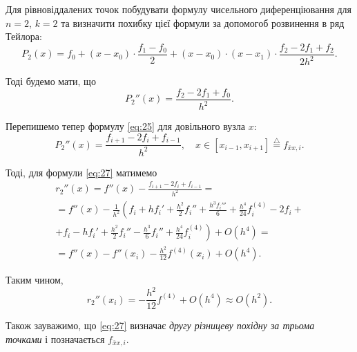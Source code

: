 \begin{example}
	Для рівновіддалених точок побудувати формулу чисельного диференціювання для $n = 2$, $k = 2$ та визначити похибку цієї формули за допомогоб розвинення в ряд Тейлора:
	\begin{equation*}
		P_2(x) = f_0 + (x - x_0) \cdot \frac{f_1 - f_0}{2} + (x - x_0) \cdot (x - x_1) \cdot \frac{f_2 - 2 f_1 + f_2}{2 h^2}.
	\end{equation*}

	Тоді будемо мати, що 
	\begin{equation}
		\label{eq:25}
		P_2''(x) = \frac{f_2 - 2 f_1 + f_0}{h^2}.
	\end{equation}

	Перепишемо тепер формулу \eqref{eq:25} для довільного вузла $x$:
	\begin{equation}
		\label{eq:27}
		P_2''(x) = \frac{f_{i + 1} - 2 f_i + f_{i - 1}}{h^2}, \quad x \in [x_{i - 1}, x_{i + 1}] \overset{\triangle}{=} f_{\bar x x, i}.
	\end{equation}	

	Тоді, для формули \eqref{eq:27} матимемо
	\begin{multline*}
		r_2''(x) = f''(x) - \frac{f_{i + 1} - 2 f_i + f_{i - 1}}{h^2} = \\ = f''(x) - \frac{1}{h^2} \left( f_i + h f_i' + \frac{h^2}{2} f_i'' + \frac{h^3 f_i'''}{6} + \frac{h^4}{24} f_i^{(4)} - 2f_i \right. + \\ \left. + f_i - h f_i' + \frac{h^2}{2} f_i'' - \frac{h^3}{6} f_i''  + \frac{h^4}{24} f_i^{(4)} \right) + O(h^4) = \\ = f''(x) - f''(x_i) - \frac{h^2}{12} f^{(4)}(x_i) + O(h^4).
	\end{multline*}

	Таким чином, 
	\begin{equation*}
		r_2''(x_i) = -\frac{h^2}{12} f^{(4)} + O(h^4) \approx O(h^2).
	\end{equation*}
\end{example}

Також зауважимо, що \eqref{eq:27} визначає \textit{другу різницеву похідну за трьома точками}
 і позначається $f_{\bar x x,i}$.

